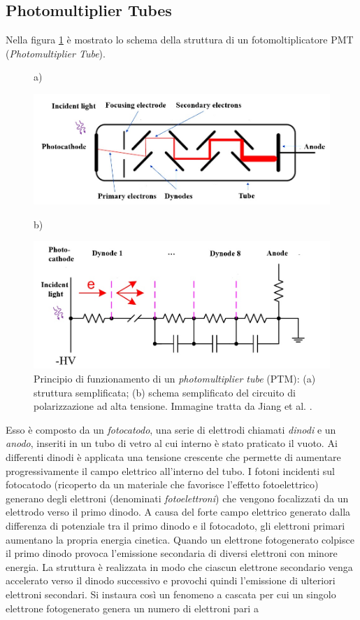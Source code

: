 \subsection{Photomultiplier Tubes}
Nella figura \ref{fig:ptm} è mostrato lo schema della struttura di un fotomoltiplicatore PMT (\textit{Photomultiplier Tube}).
\begin{figure}[b!]
	\centering
	a)
	\begin{minipage}{.70\textwidth}
		\includegraphics[width=\linewidth]{./ImageFiles/ptm.jpg}
	\end{minipage}

	b)
	\begin{minipage}{.70\textwidth}
		\includegraphics[width=\linewidth]{./ImageFiles/ptm_schema.jpg}
	\end{minipage}
	\caption{Principio di funzionamento di un \textit{photomultiplier tube} (PTM): (a) struttura semplificata; (b) schema semplificato del circuito di polarizzazione ad alta tensione. Immagine tratta da Jiang et al. \cite{Jiang2019}.}
	\label{fig:ptm}
\end{figure}
Esso è composto da un \textit{fotocatodo}, una serie di elettrodi chiamati \textit{dinodi} e un \textit{anodo}, inseriti in un tubo di vetro al cui interno è stato praticato il vuoto. Ai differenti dinodi è applicata una tensione crescente che permette di aumentare progressivamente il campo elettrico all'interno del tubo. I fotoni incidenti sul fotocatodo (ricoperto da un materiale che favorisce l'effetto fotoelettrico) generano degli elettroni (denominati \textit{fotoelettroni}) che vengono focalizzati da un elettrodo verso il primo dinodo. A causa del forte campo elettrico generato dalla differenza di potenziale tra il primo dinodo e il fotocadoto, gli elettroni primari aumentano la propria energia cinetica. Quando un elettrone fotogenerato colpisce il primo dinodo provoca l'emissione secondaria di diversi elettroni con minore energia. La struttura è realizzata in modo che ciascun elettrone secondario venga accelerato verso il dinodo successivo e provochi quindi l'emissione di ulteriori elettroni secondari. Si instaura così un fenomeno a cascata per cui un singolo elettrone fotogenerato genera un numero di elettroni pari a 
